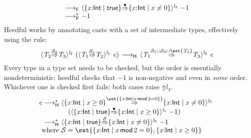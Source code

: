 \documentclass[9pt]{extarticle}
\newcommand{\ottnt}[1]{\mathit{#1}}
\newcommand{\ottsym}[1]{#1}
\begin{document}
{\[\begin{array}{r@{~}l}
         \longrightarrow _{  \mathsf{F}  }  &  \langle   \{ \mathit{x} \mathord{:}  \mathsf{Int}  \mathrel{\mid}  \mathsf{true}  \}   \mathord{ \overset{\bullet}{\Rightarrow} }   \{ \mathit{x} \mathord{:}  \mathsf{Int}  \mathrel{\mid}  \mathit{x}  \mathrel{\ne}  \ottsym{0}  \}   \rangle^{ \ottnt{l_{{\mathrm{3}}}} } ~   {-1}   \\
        \longrightarrow ^{*}_{  \mathsf{F}  }  &  {-1}      
\end{array} \]
Heedful \lambdah works by annotating casts with a set of intermediate
types, effectively using the rule:
\[  \langle  \ottnt{T_{{\mathrm{2}}}}  \mathord{ \overset{ \mathcal{S}_{{\mathrm{2}}} }{\Rightarrow} }  \ottnt{T_{{\mathrm{3}}}}  \rangle^{ \ottnt{l_{{\mathrm{2}}}} } ~   (  \langle  \ottnt{T_{{\mathrm{1}}}}  \mathord{ \overset{ \mathcal{S}_{{\mathrm{1}}} }{\Rightarrow} }  \ottnt{T_{{\mathrm{2}}}}  \rangle^{ \ottnt{l_{{\mathrm{1}}}} } ~  \ottnt{e}  )   \,  \longrightarrow _{  \mathsf{H}  }  \,  \langle  \ottnt{T_{{\mathrm{1}}}}  \mathord{ \overset{   \mathcal{S}_{{\mathrm{1}}}  \cup  \mathcal{S}_{{\mathrm{2}}}   \cup   \set{  \ottnt{T_{{\mathrm{2}}}}  }   }{\Rightarrow} }  \ottnt{T_{{\mathrm{3}}}}  \rangle^{ \ottnt{l_{{\mathrm{2}}}} } ~  \ottnt{e}  \]
Every type in a type set needs to be checked, but the order is
essentially nondeterministic: heedful \lambdah checks that $ {-1} $ is
non-negative and even in \textit{some} order. Whichever one is checked
first fails; both cases raise $ \mathord{\Uparrow}  \ottnt{l_{{\mathrm{3}}}} $.
\[ \begin{array}{r@{~}l}
  \ottnt{e}  \longrightarrow ^{*}_{  \mathsf{H}  }  &  \langle   \{ \mathit{x} \mathord{:}  \mathsf{Int}  \mathrel{\mid}  \mathit{x}  \mathrel{\ge}  \ottsym{0}  \}   \mathord{ \overset{  \set{   \{ \mathit{x} \mathord{:}  \mathsf{Int}  \mathrel{\mid}  \mathit{x} \,  \mathsf{mod}  \, \ottsym{2}  \mathrel{=}  \ottsym{0}  \}   }  }{\Rightarrow} }   \{ \mathit{x} \mathord{:}  \mathsf{Int}  \mathrel{\mid}  \mathit{x}  \mathrel{\ne}  \ottsym{0}  \}   \rangle^{ \ottnt{l_{{\mathrm{3}}}} } ~  {} \\  &  \quad   (  \langle   \{ \mathit{x} \mathord{:}  \mathsf{Int}  \mathrel{\mid}  \mathsf{true}  \}   \mathord{ \overset{\bullet}{\Rightarrow} }   \{ \mathit{x} \mathord{:}  \mathsf{Int}  \mathrel{\mid}  \mathit{x}  \mathrel{\ge}  \ottsym{0}  \}   \rangle^{ \ottnt{l_{{\mathrm{1}}}} } ~   {-1}   )   \\
         \longrightarrow ^{*}_{  \mathsf{H}  }  &  \langle   \{ \mathit{x} \mathord{:}  \mathsf{Int}  \mathrel{\mid}  \mathsf{true}  \}   \mathord{ \overset{ \mathcal{S} }{\Rightarrow} }   \{ \mathit{x} \mathord{:}  \mathsf{Int}  \mathrel{\mid}  \mathit{x}  \mathrel{\ne}  \ottsym{0}  \}   \rangle^{ \ottnt{l_{{\mathrm{3}}}} } ~   {-1}   \\
        \text{where} & \mathcal{S}  \ottsym{=}   \set{   \{ \mathit{x} \mathord{:}  \mathsf{Int}  \mathrel{\mid}  \mathit{x} \,  \mathsf{mod}  \, \ottsym{2}  \mathrel{=}  \ottsym{0}  \}  ,   \{ \mathit{x} \mathord{:}  \mathsf{Int}  \mathrel{\mid}  \mathit{x}  \mathrel{\ge}  \ottsym{0}  \}   } 
\end{array} \]


}
\end{document}
